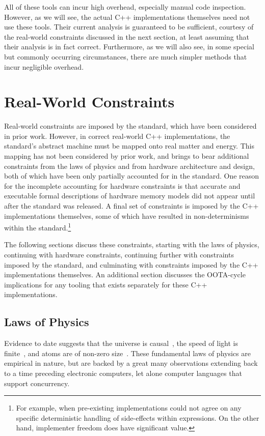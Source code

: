 \documentclass[10]{article}
\begin{document}
All of these tools can incur high overhead, especially manual code
inspection.
However, as we will see, the actual C++ implementations themselves need
not use these tools.
Their current analysis is guaranteed to be sufficient, courtesy of the
real-world constraints discussed in the next section, at least assuming
that their analysis is in fact correct.
Furthermore, as we will also see, in some special but commonly occurring
circumstances, there are much simpler methods that incur negligible overhead.

\section{Real-World Constraints}
\label{sec:Real-World Constraints}

Real-world constraints are imposed by the standard, which have been
considered in prior work.
However, in correct real-world C++ implementations, the standard's
abstract machine must be mapped onto real matter and energy.
This mapping has not been considered by prior work, and brings to
bear additional constraints from the laws of physics and from hardware
architecture and design, both of which have been only partially accounted
for in the standard.
One reason for the incomplete accounting for hardware constraints is
that accurate and executable formal descriptions of hardware memory
models did not appear until after the standard was released.
A final set of constraints is imposed by the C++ implementations
themselves, some of which have resulted in non-determinisms within
the standard.\footnote{
	For example, when pre-existing implementations could not agree
	on any specific deterministic handling of side-effects within
	expressions.
	On the other hand, implementer freedom does have significant
	value.}

The following sections discuss these constraints, starting with the
laws of physics, continuing with hardware constraints, continuing
further with constraints imposed by the standard, and culminating
with constraints imposed by the C++ implementations themselves.
An additional section discusses the OOTA-cycle implications for
any tooling that exists separately for these C++ implementations.

\subsection{Laws of Physics}
\label{sec:Laws of Physics}

Evidence to date suggests that the universe is
causal~\cite{Plato360BC-causality},
the speed of light is finite~\cite{OleRoemer1671SpeedOfLight}, and
atoms are of non-zero size~\cite{JeanBaptistePerrin1923AtomSize}.
These fundamental laws of physics are empirical in nature, but
are backed by a great many observations extending back to a time
preceding electronic computers, let alone computer languages that
support concurrency.
\end{document}
